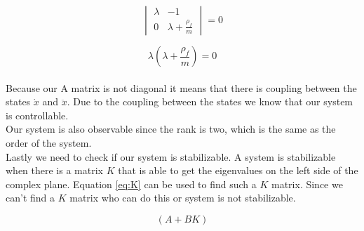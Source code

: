 \documentclass[final]{scrreprt} %
\begin{document}
\begin{enumerate}
\begin{equation}
	\begin{vmatrix}
		\lambda & -1 \\
		0 & \lambda + \frac{\rho_f}{m}
	\end{vmatrix} = 0
	\label{eq:fmatrix}
\end{equation}

\begin{equation}
	\lambda(\lambda + \frac{\rho_f}{m}) = 0
	\label{eq:characteristic}
\end{equation}
\\
Because our A matrix is not diagonal it means that there is coupling between the states $\dot{x}$ and $\ddot{x}$. Due to the coupling between the states we know that our system is controllable.\\
Our system is also observable since the rank is two, which is the same as the order of the system.\\
Lastly we need to check if our system is stabilizable. A system is stabilizable when there is a matrix $K$ that is able to get the eigenvalues on the left side of the complex plane. Equation \ref{eq:K} can be used to find such a $K$ matrix. Since we can't find a $K$ matrix who can do this or system is not stabilizable.

\begin{equation}
	(A + BK)
\label{eq:K}
\end{equation}


\end{enumerate}
\end{document}
